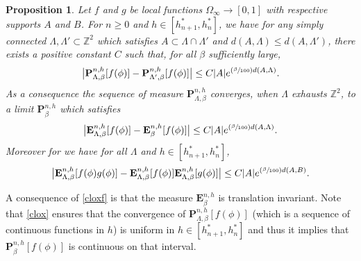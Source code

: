 \documentclass[10pt]{amsart}
\newcommand{\Psfrac}[2]{(\sfrac{#1}{#2})}
\numberwithin{equation}{section}
\theoremstyle{plain}
\newtheorem{proposition}[theorem]{Proposition}
\theoremstyle{definition}
\newcommand{\bP}{{\ensuremath{\mathbf P}} }
\newcommand{\bE}{{\ensuremath{\mathbf E}} }
\newcommand{\bbZ}{{\ensuremath{\mathbb Z}} }
\newcommand{\gb}{\beta}
\newcommand{\gO}{\Omega}
\newcommand{\gL}{\Lambda}
\begin{document}
\begin{proposition}\label{conviark}
Let $f$ and $g$ be local functions $\gO_{\infty}\to [0,1]$ with respective supports $A$ and $B$.
For $n\ge 0$ and $h\in [h^*_{n+1},h^*_n]$, we have for any simply connected $\gL,\gL'\subset \bbZ^2$ which satisfies $A\subset \gL\cap \gL'$
and $d(A,\gL)\le d(A,\gL')$, there exists a positive constant
$C$ such that, for all $\gb$ sufficiently large,
\begin{equation}\label{clox}
\bigl| \bP^{n,h}_{\gL,\gb}[f(\phi) ]-\bP^{n,h}_{\gL',\gb}[f(\phi)]\bigr|\le C|A|e^{\Psfrac{\gb}{100}d(A,\gL)}.
\end{equation}
As a consequence the sequence of measure $\bP^{n,h}_{\gL,\gb}$ converges, when $\gL$ exhausts $\bbZ^2$,
to a limit $\bP^{n,h}_{\gb}$ which satisfies
\begin{equation}\label{cloxf}
\bigl| \bE^{n,h}_{\gL,\gb}[f(\phi) ]-\bE^{n,h}_{\gb}[f(\phi)]\bigr|\le C|A|e^{\Psfrac{\gb}{100}d(A,\gL)}.
\end{equation}
Moreover for we have for all $\gL$ and $h\in [h^*_{n+1},h^*_n]$,
\begin{equation}\label{clax}
\bigl| \bE^{n,h}_{\gL,\gb}[ f(\phi)g(\phi) ]- \bE^{n,h}_{\gL,\gb}[ f(\phi)] \bE^{n,h}_{\gL,\gb}[g(\phi) ] \bigr| \le C|A|e^{\Psfrac{\gb}{100}d(A,B)}.
\end{equation}
\end{proposition}

A consequence of \eqref{cloxf} is that the measure $\bE^{n,h}_{\gb}$ is translation invariant.
Note that \eqref{clox} ensures that the convergence of $\bP^{n,h}_{\gL,\gb}[f(\phi)]$ (which is a sequence of continuous functions in $h$)
is uniform in $h\in [h^*_{n+1},h^*_n]$ and thus it implies that $\bP^{n,h}_{\gb}[f(\phi)]$ is continuous on that interval.
\end{document}
